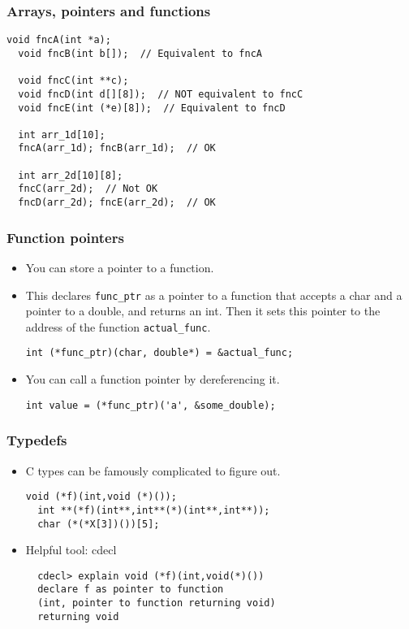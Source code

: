 \begin{frame}[fragile]
  \frametitle{Arrays, pointers and functions}
\begin{lstlisting}[style=c]
  void fncA(int *a);
  void fncB(int b[]);  // Equivalent to fncA

  void fncC(int **c);
  void fncD(int d[][8]);  // NOT equivalent to fncC
  void fncE(int (*e)[8]);  // Equivalent to fncD

  int arr_1d[10];
  fncA(arr_1d); fncB(arr_1d);  // OK

  int arr_2d[10][8];
  fncC(arr_2d);  // Not OK
  fncD(arr_2d); fncE(arr_2d);  // OK
\end{lstlisting}
\end{frame}

\begin{frame}[fragile]
  \frametitle{Function pointers}
  \begin{itemize}
  \item You can store a pointer to a function.
  \item This declares \texttt{func\_ptr} as a pointer to a function that accepts
    a char and a pointer to a double, and returns an int. Then it sets this
    pointer to the address of the function \texttt{actual\_func}.
\begin{lstlisting}[style=c]
  int (*func_ptr)(char, double*) = &actual_func;
\end{lstlisting}
  \item You can call a function pointer by dereferencing it.
\begin{lstlisting}[style=c]
  int value = (*func_ptr)('a', &some_double);
\end{lstlisting}
  \end{itemize}
\end{frame}

\begin{frame}[fragile]
  \frametitle{Typedefs}
  \begin{itemize}
  \item C types can be famously complicated to figure out.
\begin{lstlisting}[style=c]
  void (*f)(int,void (*)());
  int **(*f)(int**,int**(*)(int**,int**));
  char (*(*X[3])())[5];
\end{lstlisting}
  \item Helpful tool: cdecl
\begin{lstlisting}
  cdecl> explain void (*f)(int,void(*)())
  declare f as pointer to function
  (int, pointer to function returning void)
  returning void
\end{lstlisting}
  \end{itemize}
\end{frame}

